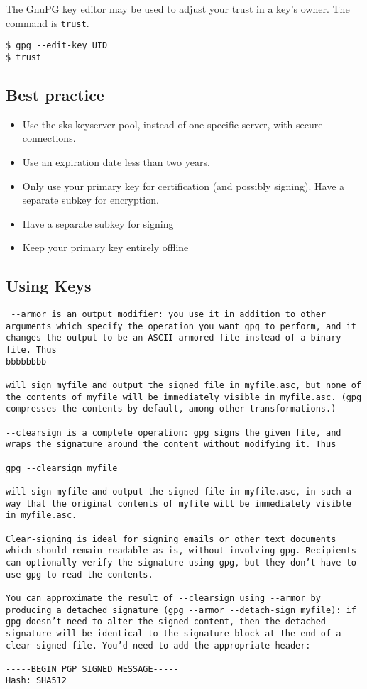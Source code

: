 The GnuPG key editor may be used to adjust your trust in a key's owner. The
command is \verb+trust+. 
\begin{verbatim}
$ gpg --edit-key UID
$ trust
\end{verbatim}

\subsection{Best practice}
\begin{itemize}
    \item Use the sks keyserver pool, instead of one specific server, with
        secure connections.
    \item Use an expiration date less than two years.
    \item Only use your primary key for certification (and possibly signing).
        Have a separate subkey for encryption.
    \item Have a separate subkey for signing
    \item Keep your primary key entirely offline
\end{itemize}

\subsection{Using Keys}

\begin{verbatim}
 --armor is an output modifier: you use it in addition to other arguments which specify the operation you want gpg to perform, and it changes the output to be an ASCII-armored file instead of a binary file. Thus
bbbbbbbb

will sign myfile and output the signed file in myfile.asc, but none of the contents of myfile will be immediately visible in myfile.asc. (gpg compresses the contents by default, among other transformations.)

--clearsign is a complete operation: gpg signs the given file, and wraps the signature around the content without modifying it. Thus

gpg --clearsign myfile

will sign myfile and output the signed file in myfile.asc, in such a way that the original contents of myfile will be immediately visible in myfile.asc.

Clear-signing is ideal for signing emails or other text documents which should remain readable as-is, without involving gpg. Recipients can optionally verify the signature using gpg, but they don’t have to use gpg to read the contents.

You can approximate the result of --clearsign using --armor by producing a detached signature (gpg --armor --detach-sign myfile): if gpg doesn’t need to alter the signed content, then the detached signature will be identical to the signature block at the end of a clear-signed file. You’d need to add the appropriate header:

-----BEGIN PGP SIGNED MESSAGE-----
Hash: SHA512
\end{verbatim}

